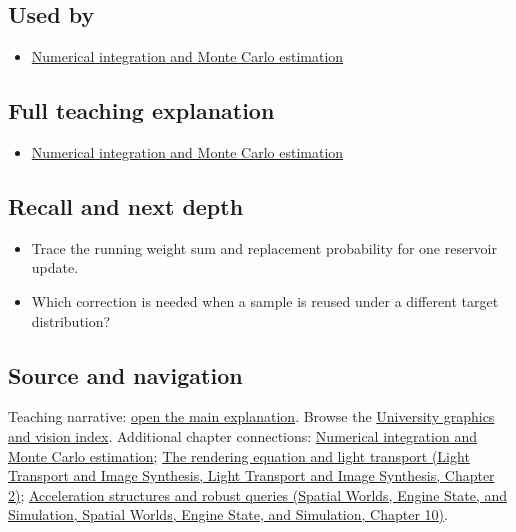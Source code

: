 \subsection{Used by}\label{appendix-68be451b78b1-used-by}

\begin{itemize}
\tightlist
\item
  \hyperref[03-visual-computing-i-ch012-numerical-integration-and-monte-carlo-estimation]{Numerical integration and Monte Carlo estimation}
\end{itemize}

\subsection{Full teaching explanation}\label{appendix-68be451b78b1-full-teaching-explanation}

\begin{itemize}
\tightlist
\item
  \hyperref[03-visual-computing-i-ch012-numerical-integration-and-monte-carlo-estimation]{Numerical integration and Monte Carlo estimation}
\end{itemize}

\subsection{Recall and next depth}\label{appendix-68be451b78b1-recall-and-next-depth}

\begin{itemize}
\tightlist
\item
  Trace the running weight sum and replacement probability for one reservoir update.
\item
  Which correction is needed when a sample is reused under a different target distribution?
\end{itemize}

\subsection{Source and navigation}\label{appendix-68be451b78b1-source-and-navigation}

Teaching narrative: \hyperref[03-visual-computing-i-ch012-numerical-integration-and-monte-carlo-estimation]{open the main explanation}. Browse the \hyperref[appendix-a6d556a4ef50-university-graphics-vision-and-photography---independent-series]{University graphics and vision index}. Additional chapter connections: \hyperref[03-visual-computing-i-ch012-numerical-integration-and-monte-carlo-estimation]{Numerical integration and Monte Carlo estimation}; \href{../04-Light-Transport-and-Image-Synthesis/main.pdf\#nameddest=03-visual-computing-i-ch007-the-rendering-equation-and-light-transport}{The rendering equation and light transport (Light Transport and Image Synthesis, Light Transport and Image Synthesis, Chapter 2)}; \href{../05-Spatial-Worlds-Engine-State-and-Simulation/main.pdf\#nameddest=04-visual-computing-ii-ch029-acceleration-structures-and-robust-queries-1}{Acceleration structures and robust queries (Spatial Worlds, Engine State, and Simulation, Spatial Worlds, Engine State, and Simulation, Chapter 10)}.


